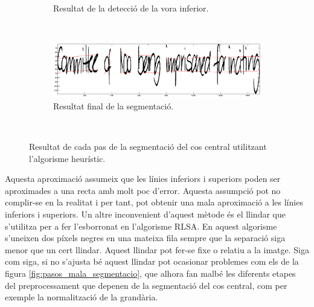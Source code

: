 \begin{figure}
\begin{subfigure}[b]{0.8\textwidth}
\caption{Resultat de la detecció de la vora inferior.}\label{fig:pasos_segmentacio_heuristica_inf}
\end{subfigure}\\
\begin{subfigure}[b]{0.8\textwidth}
\centering
\includegraphics[width=\textwidth]{images/pasos_segmentacio_heuristica_final.eps}
\caption{Resultat final de la segmentació.}\label{fig:pasos_segmentacio_heuristica_final}
\end{subfigure}\\
\caption{Resultat de cada pas de la segmentació del cos central utilitzant l'algorisme heurístic.}\label{fig:pasos_segmentacio_heuristica}
\end{figure}

Aquesta aproximació assumeix que les línies inferiors i superiors poden ser aproximades a una recta amb molt poc d'error. Aquesta assumpció pot no complir-se en la realitat i per tant, pot obtenir una mala aproximació a les línies inferiors i superiors. Un altre inconvenient d'aquest mètode és el llindar que s'utilitza per a fer l'esborronat en l'algorisme RLSA. En aquest algorisme s'uneixen dos píxels negres en una mateixa fila sempre que la separació siga menor que un cert llindar. Aquest llindar pot fer-se fixe o relatiu a la imatge. Siga com siga, si no s'ajusta bé aquest llindar pot ocasionar problemes com els de la figura \ref{fig:pasos_mala_segmentacio}, que alhora fan malbé les diferents etapes del preprocessament que depenen de la segmentació del cos central, com per exemple la normalització de la grandària.

